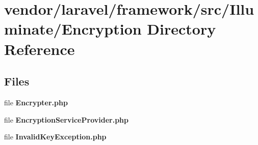 \section{vendor/laravel/framework/src/\+Illuminate/\+Encryption Directory Reference}
\label{dir_6a42080668dbcc6c1694eaf0e2948504}
\subsection*{Files}
\begin{DoxyCompactItemize}
\item 
file {\bf Encrypter.\+php}
\item 
file {\bf Encryption\+Service\+Provider.\+php}
\item 
file {\bf Invalid\+Key\+Exception.\+php}
\end{DoxyCompactItemize}
